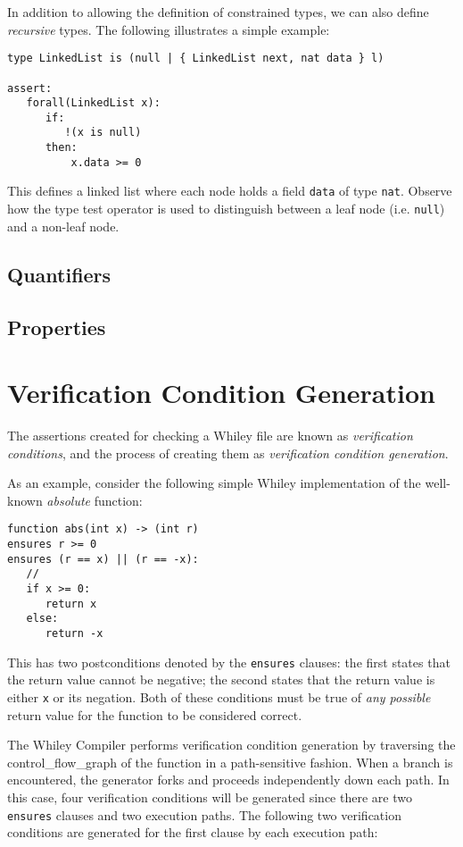In addition to allowing the definition of constrained types, we can
also define {\em recursive} types.  The following illustrates a simple
example:

\begin{lstlisting}[language=WyAL]
type LinkedList is (null | { LinkedList next, nat data } l)

assert:
   forall(LinkedList x):
      if:
         !(x is null)
      then:
          x.data >= 0
\end{lstlisting}
This defines a linked list where each node holds a field
\lstinline{data} of type \lstinline{nat}.  Observe how the type test
operator is used to distinguish between a leaf node
(i.e. \lstinline{null}) and a non-leaf node.

\subsection{Quantifiers}

\subsection{Properties}

\section{Verification Condition Generation}

The assertions created for checking a Whiley file are known as {\em
  verification conditions}, and the process of creating them as {\em
  verification condition generation}.

As an example, consider the following simple Whiley implementation of
the well-known {\em absolute} function:

\begin{lstlisting}[language=Whiley]
function abs(int x) -> (int r)
ensures r >= 0
ensures (r == x) || (r == -x):
   //
   if x >= 0:
      return x
   else:
      return -x
\end{lstlisting}


This has two postconditions denoted by the \lstinline{ensures}
clauses: the first states that the return value cannot be negative;
the second states that the return value is either \lstinline{x} or its
negation.  Both of these conditions must be true of {\em any possible}
return value for the function to be considered correct.

The Whiley Compiler performs verification condition generation by
traversing the \gls{control_flow_graph} of the function in a
path-sensitive fashion.  When a branch is encountered, the generator
forks and proceeds independently down each path.  In this case, four
verification conditions will be generated since there are two
\lstinline{ensures} clauses and two execution paths.  The following
two verification conditions are generated for the first clause by each
execution path:

